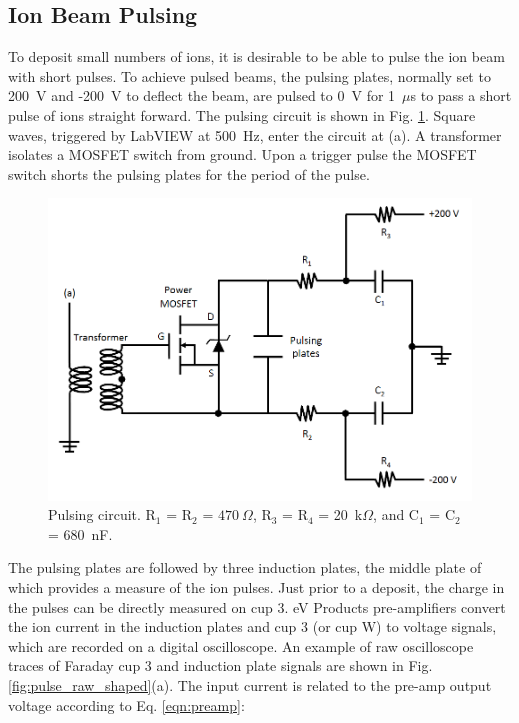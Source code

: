 

\subsection{Ion Beam Pulsing}

To deposit small numbers of ions, it is desirable to be able to pulse the ion beam with short pulses.  To achieve pulsed beams, the pulsing plates, normally set to 200~V and -200~V to deflect the beam, are pulsed to 0~V for 1~$\mu$s to pass a short pulse of ions straight forward.  The pulsing circuit is shown in Fig. \ref{fig:pulse_circuit}.  Square waves, triggered by LabVIEW at 500~Hz, enter the circuit at (a). A transformer isolates a MOSFET switch from ground.  Upon a trigger pulse the MOSFET switch shorts the pulsing plates for the period of the pulse.

\begin{figure} %
        \centering
                \includegraphics[width=.85\textwidth]{figures/pulsing_circuit.png}
                \caption{Pulsing circuit.  R$_{1}$ = R$_{2}$ = $470~\Omega$, R$_{3}$ = R$_{4}$ = 20~k$\Omega$, and \newline C$_{1}$ = C$_{2}$ = 680~nF. \cite{Shon}}
\label{fig:pulse_circuit}
\end{figure}

The pulsing plates are followed by three induction plates, the middle plate of which provides a measure of the ion pulses.  Just prior to a deposit, the charge in the pulses can be directly measured on cup 3.  eV Products pre-amplifiers convert the ion current in the induction plates and cup 3 (or cup W) to voltage signals, which are recorded on a digital oscilloscope.  An example of raw oscilloscope traces of Faraday cup 3 and induction plate signals are shown in Fig. \ref{fig:pulse_raw_shaped}(a).  The input current is related to the pre-amp output voltage according to Eq. \ref{eqn:preamp}:


